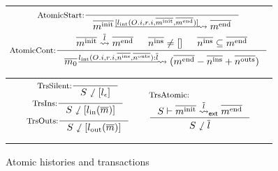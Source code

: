 \documentclass[sigplan,10pt,review,anonymous,screen]{acmart}\settopmatter{printfolios=true,printccs=false,printacmref=false}
\begin{document}
\begin{figure}[t]
  \centering
  \begin{tabular}{|c|}
    \hline
    \begin{math}
      \arraycolsep=-2pt
      \begin{array}{c}
        \inference[AtomicStart:]{}{\atomicLong{\listof{\amsgi{m}}}{\listsingle{\lblInt{\idxOf{O}}{\idxOf{r}}{\listof{\amsgi{m}}}{\listof{\amsge{m}}}}}{\listof{\amsge{m}}}} \\
        \inference[AtomicCont:]{\atomic{\listof{\amsgi{m}}}{\listof{l}}{\listof{\amsge{m}}}
          & \msgIns{n} \neq \listnil
          & \msgIns{n} \subseteq \listof{\amsge{m}}}{\atomicLong{\listof{m_0}}{\listcons{\lblInt{\idxOf{O}}{\idxOf{r}}{\msgIns{n}}{\msgOuts{n}}}{\listof{l}}}{(\listapp{\listsub{\listof{\amsge{m}}}{\msgIns{n}}}{\msgOuts{n}}})} \\
        \mbox{}\vspace{-5pt} %
      \end{array}
    \end{math}\\
    \hline
    \begin{math}
      \begin{array}{cc}
        \begin{array}{c}
          \inference[TrsSilent:]{}{\trsn{S}{\listsingle{\lblEmpty{}}}} \\
          \inference[TrsIns:]{}{\trsn{S}{\listsingle{\lblIns{\listof{m}}}}} \\
          \inference[TrsOuts:]{}{\trsn{S}{\listsingle{\lblOuts{\listof{m}}}}} \\
          \mbox{}\vspace{-5pt} %
        \end{array} &
        \begin{array}{l}
          \textrm{\footnotesize TrsAtomic:} \\
          \inference[]{\extatomic{S}{\listof{\amsgi{m}}}{\listof{l}}{\listof{\amsge{m}}}}{\trsn{S}{\listof{l}}}
        \end{array} \\
      \end{array}
    \end{math}\\
    \hline
  \end{tabular}
  \caption{Atomic histories and transactions}
  \vspace{-5pt}
  \label{fig-hemiola-trs}
\end{figure}
\end{document}

